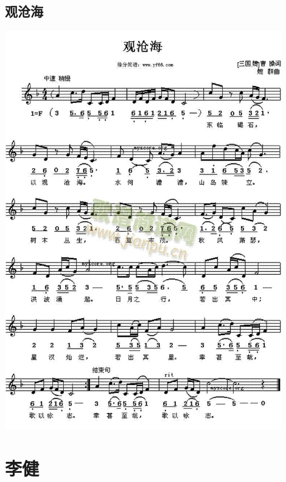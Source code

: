 \documentclass[cn,pad,twocol]{elegantbook}
\begin{document}
\section{观沧海}    \includegraphics[width=0.9\textwidth]{dongxiao/20200808-观沧海-曹操.jpg}                             
\chapter{李健}
\end{document}
